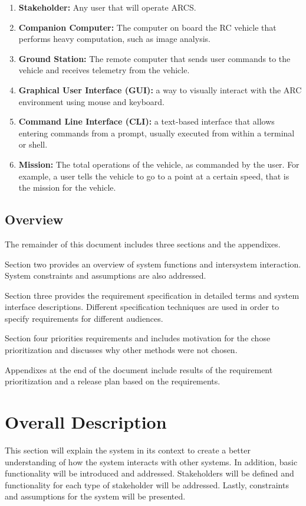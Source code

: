 \documentclass[compsoc,draftclsnofoot,onecolumn,10pt]{IEEEtran}
\begin{document}
\begin{enumerate}
	\item \textbf{Stakeholder:} Any user that will operate ARCS.
	\item \textbf{Companion Computer:} The computer on board the RC vehicle that performs heavy computation, such as image analysis.
	\item \textbf{Ground Station:} The remote computer that sends user commands to the vehicle and receives telemetry from the vehicle.
	\item \textbf{Graphical User Interface (GUI):} a way to visually interact with the ARC environment using mouse and keyboard.
	\item \textbf{Command Line Interface (CLI):} a text-based interface that allows entering commands from a prompt, usually executed from within a terminal or shell.
	\item \textbf{Mission:} The total operations of the vehicle, as commanded by the user. For example, a user tells the vehicle to go to a point at a certain speed, that is the mission for the vehicle.
\end{enumerate}




\subsection{Overview} %
The remainder of this document includes three sections and the appendixes. \par
Section two provides an overview of system functions and intersystem interaction. 
System constraints and assumptions are also addressed. \par
Section three provides the requirement specification in detailed terms and system interface descriptions. 
Different specification techniques are used in order to specify requirements for different audiences. \par
Section four priorities requirements and includes motivation for the chose prioritization and discusses why other methods were not chosen. \par
Appendixes at the end of the document include results of the requirement prioritization and a release plan based on the requirements. \cite{IEEE830}

\section{Overall Description} %
This section will explain the system in its context to create a better understanding of how the system interacts with other systems.
In addition, basic functionality will be introduced and addressed. 
Stakeholders will be defined and functionality for each type of stakeholder will be addressed. 
Lastly, constraints and assumptions for the system will be presented. 
\end{document}
